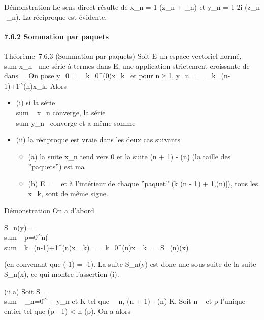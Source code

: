 \documentclass[]{article}
\begin{document}
Démonstration Le sens direct résulte de x\_n = 1
 (z\_n +
\overlinez\_n) et y\_n = 1
\over 2i (z\_n
-\overlinez\_n). La réciproque est évidente.

\paragraph{7.6.2 Sommation par paquets}

Théorème~7.6.3 (Sommation par paquets) Soit E un espace vectoriel normé,
\\sum  x\_n~ une
série à termes dans E, \phi une application strictement croissante de ~
dans ~. On pose y\_0 =\
\sum  \_k=0^\phi(0)x\_k~ et
pour n ≥ 1, y\_n =\
\sum ~
\_k=\phi(n-1)+1^\phi(n)x\_k. Alors

\begin{itemize}
\itemsep1pt\parskip0pt
\item
  (i) si la série \\sum ~
  x\_n converge, la série
  \\sum  y\_n~
  converge et a même somme
\item
  (ii) la réciproque est vraie dans les deux cas suivants

  \begin{itemize}
  \itemsep1pt\parskip0pt
  \item
    (a) la suite x\_n tend vers 0 et la suite \phi(n + 1) - \phi(n)
    (la taille des ''paquets'') est ma
  \item
    (b) E = ~ et à l'intérieur de chaque ''paquet'' (k \in {[}\phi(n - 1) +
    1,\phi(n){]}), tous les x\_k, sont de même signe.
  \end{itemize}
\end{itemize}

Démonstration On a d'abord

S\_n(y) = \\sum
\_p=0^n(\\sum
\_k=\phi(n-1)+1^\phi(n)x\_ k) =
\sum \_k=0^\phi(n)x\_ k~ =
S\_\phi(n)(x)

(en convenant que \phi(-1) = -1). La suite S\_n(y) est donc une
sous suite de la suite S\_n(x), ce qui montre l'assertion (i).

(ii.a) Soit S = \\sum ~
\_n=0^+\infty~y\_n et K tel que
\forall~~n, \phi(n + 1) - \phi(n) \leq K. Soit n \in {}~ et p
l'unique entier tel que \phi(p - 1) \textless{} n \leq \phi(p). On a alors
\end{document}
